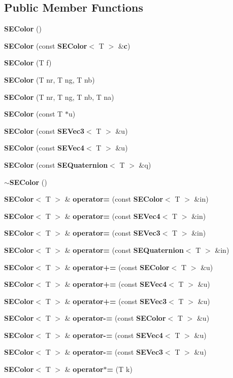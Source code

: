 \subsection*{Public Member Functions}
\begin{DoxyCompactItemize}
\item 
{\bf S\+E\+Color} ()
\item 
{\bf S\+E\+Color} (const {\bf S\+E\+Color}$<$ T $>$ \&{\bf c})
\item 
{\bf S\+E\+Color} (T f)
\item 
{\bf S\+E\+Color} (T nr, T ng, T nb)
\item 
{\bf S\+E\+Color} (T nr, T ng, T nb, T na)
\item 
{\bf S\+E\+Color} (const T $\ast$u)
\item 
{\bf S\+E\+Color} (const {\bf S\+E\+Vec3}$<$ T $>$ \&u)
\item 
{\bf S\+E\+Color} (const {\bf S\+E\+Vec4}$<$ T $>$ \&u)
\item 
{\bf S\+E\+Color} (const {\bf S\+E\+Quaternion}$<$ T $>$ \&q)
\item 
{\bf $\sim$\+S\+E\+Color} ()
\item 
{\bf S\+E\+Color}$<$ T $>$ \& {\bf operator=} (const {\bf S\+E\+Color}$<$ T $>$ \&in)
\item 
{\bf S\+E\+Color}$<$ T $>$ \& {\bf operator=} (const {\bf S\+E\+Vec4}$<$ T $>$ \&in)
\item 
{\bf S\+E\+Color}$<$ T $>$ \& {\bf operator=} (const {\bf S\+E\+Vec3}$<$ T $>$ \&in)
\item 
{\bf S\+E\+Color}$<$ T $>$ \& {\bf operator=} (const {\bf S\+E\+Quaternion}$<$ T $>$ \&in)
\item 
{\bf S\+E\+Color}$<$ T $>$ \& {\bf operator+=} (const {\bf S\+E\+Color}$<$ T $>$ \&u)
\item 
{\bf S\+E\+Color}$<$ T $>$ \& {\bf operator+=} (const {\bf S\+E\+Vec4}$<$ T $>$ \&u)
\item 
{\bf S\+E\+Color}$<$ T $>$ \& {\bf operator+=} (const {\bf S\+E\+Vec3}$<$ T $>$ \&u)
\item 
{\bf S\+E\+Color}$<$ T $>$ \& {\bf operator-\/=} (const {\bf S\+E\+Color}$<$ T $>$ \&u)
\item 
{\bf S\+E\+Color}$<$ T $>$ \& {\bf operator-\/=} (const {\bf S\+E\+Vec4}$<$ T $>$ \&u)
\item 
{\bf S\+E\+Color}$<$ T $>$ \& {\bf operator-\/=} (const {\bf S\+E\+Vec3}$<$ T $>$ \&u)
\item 
{\bf S\+E\+Color}$<$ T $>$ \& {\bf operator$\ast$=} (T k)

\end{DoxyCompactItemize}
